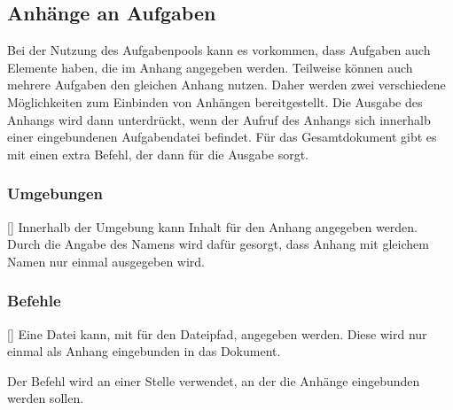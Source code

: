 \subsection{Anhänge an Aufgaben}
Bei der Nutzung des Aufgabenpools kann es vorkommen, dass Aufgaben auch Elemente haben, die im Anhang angegeben werden. Teilweise können auch mehrere Aufgaben den gleichen Anhang nutzen. Daher werden zwei verschiedene Möglichkeiten zum Einbinden von Anhängen bereitgestellt. Die Ausgabe des Anhangs wird dann unterdrückt, wenn der Aufruf des Anhangs sich innerhalb einer eingebundenen Aufgabendatei befindet. Für das Gesamtdokument gibt es mit  einen extra Befehl, der dann für die Ausgabe sorgt.

\subsubsection{Umgebungen}
\begin{environments}
    []
    Innerhalb der Umgebung kann Inhalt für den Anhang angegeben werden. Durch die Angabe des Namens wird dafür gesorgt, dass Anhang mit gleichem Namen nur einmal ausgegeben wird.
\end{environments}

\subsubsection{Befehle}
\begin{commands}
    []
        Eine Datei kann, mit  für den Dateipfad, angegeben werden. Diese wird nur einmal als Anhang eingebunden in das Dokument.

        Der Befehl wird an einer Stelle verwendet, an der die Anhänge eingebunden werden sollen.
\end{commands}
